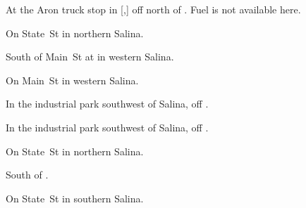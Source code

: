 
\begin{LocationList}

At the Aron truck stop in [,] off  north of .
Fuel is not available here.

On  State~St in northern Salina.

South of Main~St at  in western Salina.

On Main~St in western Salina.

In the industrial park southwest of Salina, off  .

In the industrial park southwest of Salina, off  .

On  State~St in northern Salina.

\Location{\TruckStop \Gas \Rest \Weigh}
South of  .

On   State~St in southern Salina.

\end{LocationList}
